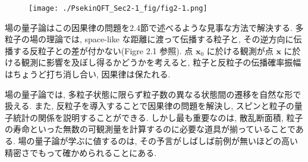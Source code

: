 \documentclass[a4paper,12pt]{article}
\begin{document}
\begin{figure}[H]
  \centering
  \texttt{[image: ./PsekinQFT\_Sec2-1\_fig/fig2-1.png]}
\end{figure}

\noindent 場の量子論はこの因果律の問題を2.4節で述べるような見事な方法で解決する. 多粒子の場の理論では, space-like な距離に渡って伝播する粒子と, その逆方向に伝播する反粒子との差が付かない(Figre 2.1 参照). 点 $\boldsymbol{x}_0$ に於ける観測が点 $\boldsymbol{x}$ に於ける観測に影響を及ぼし得るかどうかを考えると, 粒子と反粒子の伝播確率振幅はちょうど打ち消し合い, 因果律は保たれる.
  
場の量子論では, 多粒子状態に限らず粒子数の異なる状態間の遷移を自然な形で扱える. また, 反粒子を導入することで因果律の問題を解決し, スピンと粒子の量子統計の関係を説明することができる. しかし最も重要なのは, 散乱断面積, 粒子の寿命といった無数の可観測量を計算するのに必要な道具が揃っていることである. 場の量子論が学ぶに値するのは, その予言がしばしば前例が無いほどの高い精密さでもって確かめられることにある.
\end{document}
